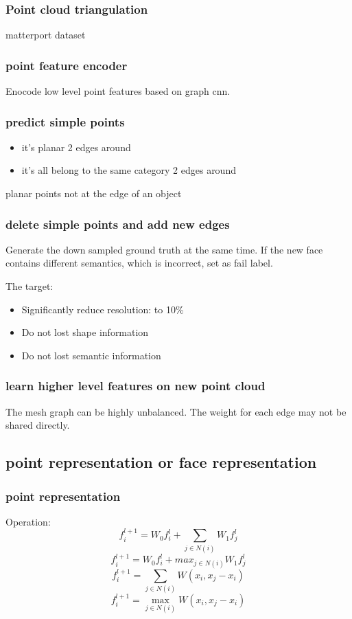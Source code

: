\documentclass[,table,dvipsnames]{article}
\begin{document}
\subsubsection{Point cloud triangulation}
matterport dataset
\subsubsection{point feature encoder}
Enocode low level point features based on graph cnn.
\subsubsection{predict simple points}
\begin{itemize}
	\item it's planar 2 edges around
	\item it's all belong to the same category 2 edges around
\end{itemize}
planar points not at the edge of an object
\subsubsection{delete simple points and add new edges}

Generate the down sampled ground truth at the same time. If the new face contains different semantics, which is incorrect, set as fail label.
\par \noindent
The target:
\begin{itemize}
	\item Significantly reduce resolution: to 10\%
	\item Do not lost shape information
	\item Do not lost semantic information
	

	
\end{itemize}
\subsubsection{learn higher level features on new point cloud}
The mesh graph can be highly unbalanced. The weight for each edge may not be shared directly. 

\subsection{point representation or face representation}
\subsubsection{point representation}
Operation:
$$f_i^{l+1} = W_0f_i^l + \sum_{j\in N(i)}W_1 f_j^l$$
$$f_i^{l+1} = W_0f_i^l + max_{j\in N(i)}W_1 f_j^l$$
$$f_i^{l+1} = \sum_{j\in N(i)}W(x_i, x_j-x_i) $$
$$f_i^{l+1} = \max_{j\in N(i)}W(x_i, x_j-x_i) $$
\par \noindent
\end{document}
